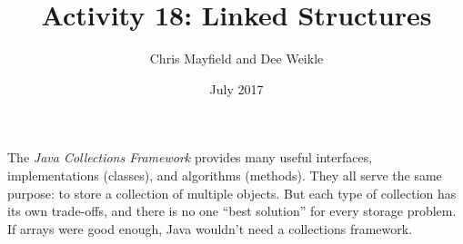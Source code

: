 \documentclass[12pt]{article}
\title{Activity 18: Linked Structures}
\author{Chris Mayfield and Dee Weikle}
\date{July 2017}
\begin{document}
\maketitle

The \textit{Java Collections Framework} provides many useful interfaces, implementations (classes), and algorithms (methods).
They all serve the same purpose: to store a collection of multiple objects.
But each type of collection has its own trade-offs, and there is no one ``best solution'' for every storage problem.
If arrays were good enough, Java wouldn't need a collections framework.





\newpage


\end{document}
